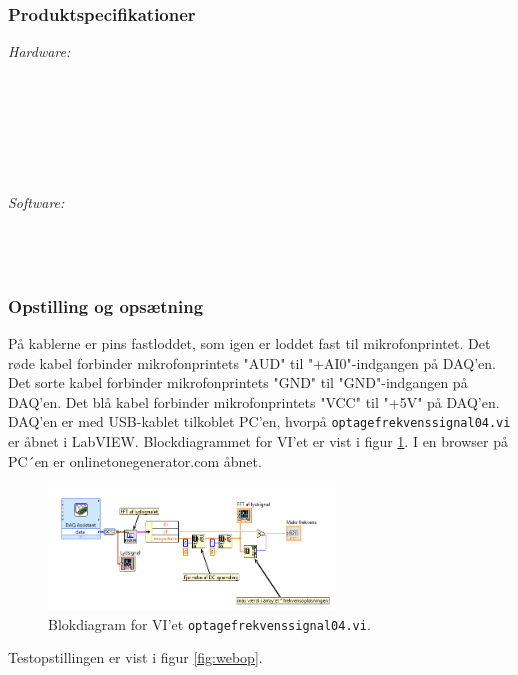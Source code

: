 		
		\subsubsection{Produktspecifikationer}
	
			\textit{Hardware:}\\
			\elektret\\
			\pinstre\\
			\mikrofonkabel\\
			\krympeflex\\
			\daq\\
			\daqusb\\			
			\PC
	
			\textit{Software:}\\
			\labview\\
			\daqsoft\\
			\onlineg\\
	
		\subsubsection{Opstilling og opsætning}
		På kablerne er pins fastloddet, som igen er loddet fast til mikrofonprintet. Det røde kabel forbinder mikrofonprintets "AUD"{} til "+AI0"{}-indgangen på DAQ'en. Det sorte kabel forbinder mikrofonprintets "GND"{} til "GND"{}-indgangen på DAQ'en. Det blå kabel forbinder mikrofonprintets "VCC"{} til "+5V"{} på DAQ'en. DAQ'en er med USB-kablet tilkoblet PC'en, hvorpå \texttt{optagefrekvenssignal04.vi} er åbnet i LabVIEW. Blockdiagrammet for VI'et er vist i figur \ref{fig:op04}. I en browser på PC´en er onlinetonegenerator.com åbnet.    
		
		\begin{figure}[htb]
			\centering
			\includegraphics[width=3in]{optagefrekvenssignal04}
			\caption{Blokdiagram for VI'et \texttt{optagefrekvenssignal04.vi}.}
			\label{fig:op04}
		\end{figure}
		
		Testopstillingen er vist i figur \ref{fig:webop}.\\
		
